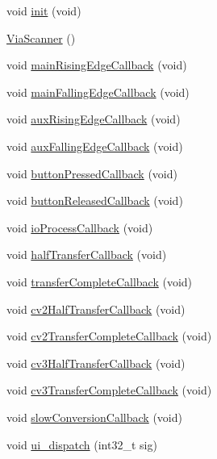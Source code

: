 \begin{DoxyCompactItemize}
\item 
void \mbox{\hyperlink{class_via_scanner_a90596d92344fd4bc805b65142dde3e77}{init}} (void)
\item 
\mbox{\hyperlink{class_via_scanner_a4c6d8ee19c222188b16fec29494f14df}{Via\+Scanner}} ()
\item 
void \mbox{\hyperlink{class_via_scanner_a4199fdf25d18f8f4e40c8d22a8ac8b7c}{main\+Rising\+Edge\+Callback}} (void)
\item 
void \mbox{\hyperlink{class_via_scanner_a317f19b3d9726eca23deb4a8972c5ea1}{main\+Falling\+Edge\+Callback}} (void)
\item 
void \mbox{\hyperlink{class_via_scanner_abcc13461ed886eab18eb3dd2f55f3f40}{aux\+Rising\+Edge\+Callback}} (void)
\item 
void \mbox{\hyperlink{class_via_scanner_ab790912e79b3a02e96e400f038cbe2fe}{aux\+Falling\+Edge\+Callback}} (void)
\item 
void \mbox{\hyperlink{class_via_scanner_a5c79c2510c208303e73b8e6ecc318d78}{button\+Pressed\+Callback}} (void)
\item 
void \mbox{\hyperlink{class_via_scanner_a873527f0efc0320f877d16319e6928fa}{button\+Released\+Callback}} (void)
\item 
void \mbox{\hyperlink{class_via_scanner_adf0841f79cddfb663135395ff132eea1}{io\+Process\+Callback}} (void)
\item 
void \mbox{\hyperlink{class_via_scanner_a7e91b9d8b7be2dc955ee2b6b28c9fbfc}{half\+Transfer\+Callback}} (void)
\item 
void \mbox{\hyperlink{class_via_scanner_ad34ccf0e36d548ec69fd63da7f8e7655}{transfer\+Complete\+Callback}} (void)
\item 
void \mbox{\hyperlink{class_via_scanner_adcf828a62a23583739e4f5bbd32bc5b4}{cv2\+Half\+Transfer\+Callback}} (void)
\item 
void \mbox{\hyperlink{class_via_scanner_af7749d3570e86b89a03abaa50c87d9b9}{cv2\+Transfer\+Complete\+Callback}} (void)
\item 
void \mbox{\hyperlink{class_via_scanner_ad0bc8dc32a300843f349aae4631d7dc3}{cv3\+Half\+Transfer\+Callback}} (void)
\item 
void \mbox{\hyperlink{class_via_scanner_a6697e87d45ec8eb1d0259f389f869f30}{cv3\+Transfer\+Complete\+Callback}} (void)
\item 
void \mbox{\hyperlink{class_via_scanner_ae13ff5f8cbd768a0955cac416a695430}{slow\+Conversion\+Callback}} (void)
\item 
void \mbox{\hyperlink{class_via_scanner_a84a5b3f6009d266fad3fc5661b6d755e}{ui\+\_\+dispatch}} (int32\+\_\+t sig)
\end{DoxyCompactItemize}
